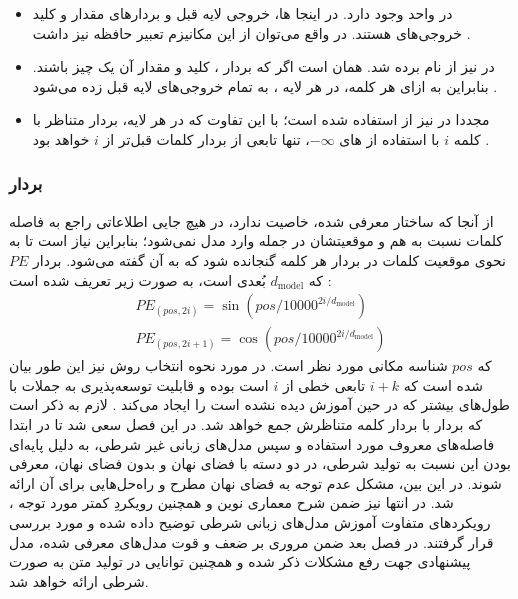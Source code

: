 \begin{itemize}
    \item
    در \decoder{} واحد \multiheadattention{} وجود دارد. در اینجا \query{} ها، خروجی لایه قبل \decoder{} و بردارهای مقدار و کلید خروجی‌های \encoder{} هستند. در واقع می‌توان از این مکانیزم تعبیر حافظه نیز داشت \cite{transformer}.
    \item
    در \encoder{} نیز از \multiheadselfattention{} نام برده شد. \multiheadselfattention{} همان \multiheadattention{} است اگر که بردار \query{}، کلید و مقدار آن یک چیز باشند. بنابراین به ازای هر کلمه، در هر لایه \encoder{}، به تمام خروجی‌های لایه قبل \multiheadselfattention{} زده می‌شود \cite{transformer}.
    \item
    مجددا در \decoder{} نیز از \multiheadselfattention{} استفاده شده است؛ با این تفاوت که در هر لایه، بردار متناظر با کلمه $i$ با استفاده از \mask{}‌های $-\infty$، تنها تابعی از بردار کلمات قبل‌تر از $i$ خواهد بود \cite{transformer}.
\end{itemize}

\subsubsection{بردار
    }
از آنجا که ساختار معرفی شده، خاصیت \recurrence{} ندارد، در هیچ جایی اطلاعاتی راجع به فاصله کلمات نسبت به هم و موقعیتشان در جمله وارد مدل نمی‌شود؛ بنابراین نیاز است تا به نحوی موقعیت کلمات در بردار \embedding{} هر کلمه گنجانده شود که به آن \positionalembedding{} گفته می‌شود. بردار \positionalembedding{}
$PE$
که $d_\text{model}$ بُعدی است، به صورت زیر تعریف شده است \cite{transformer}:
\begin{align}
PE_{(pos, 2i)} = \sin ( pos / 10000^{2i/d_\text{model}}) \nonumber
\\
PE_{(pos, 2i+1)} = \cos ( pos / 10000^{2i/d_\text{model}})
\end{align}
که $pos$ شناسه مکانی مورد نظر است. در مورد نحوه انتخاب روش \encoding{} نیز این طور بیان شده است که
\positionalembedding{}  $i+k$
تابعی خطی از
\positionalembedding{} $i$
است بوده و قابلیت توسعه‌پذیری به جملات با طول‌های بیشتر که در حین آموزش دیده نشده است را ایجاد می‌کند \cite{transformer}. لازم به ذکر است که بردار \positionalembedding{} با بردار \embedding{} کلمه متناظرش جمع خواهد شد.
\newline
در این فصل سعی شد تا در ابتدا فاصله‌های معروف مورد استفاده و سپس مدل‌های زبانی غیر شرطی، به دلیل پایه‌ای بودن این \task{} نسبت به \task{} تولید شرطی، در دو دسته با فضای نهان و بدون فضای نهان، معرفی شوند. در این بین، مشکل عدم توجه به فضای نهان مطرح و راه‌حل‌هایی برای آن ارائه شد. در انتها نیز ضمن شرح معماری نوین \transformer{} و همچنین رویکردِ کمتر مورد توجه \normalizingflownets{}، رویکرد‌های متفاوت آموزش مدل‌های زبانی شرطی توضیح داده شده و مورد بررسی قرار گرفتند.
در فصل بعد ضمن مروری بر ضعف و قوت مدل‌های معرفی شده، مدل پیشنهادی جهت رفع مشکلات ذکر شده و همچنین توانایی در تولید متن به صورت شرطی ارائه خواهد شد.
